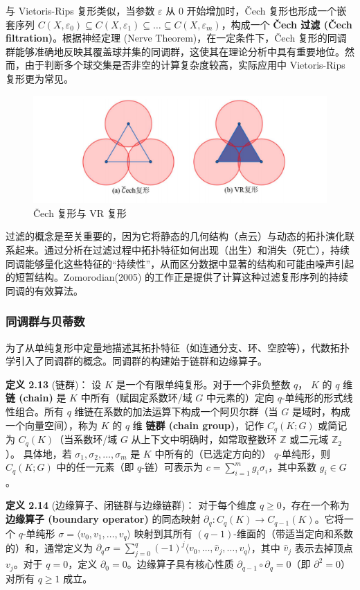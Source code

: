 与 Vietoris-Rips 复形类似，当参数 $\varepsilon$ 从 $0$ 开始增加时，Čech 复形也形成一个嵌套序列 $C(X, \varepsilon_0) \subseteq C(X, \varepsilon_1) \subseteq \dots \subseteq C(X, \varepsilon_m)$，构成一个 \textbf{Čech 过滤 (Čech filtration)}。根据神经定理 (Nerve Theorem)，在一定条件下，Čech 复形的同调群能够准确地反映其覆盖球并集的同调群，这使其在理论分析中具有重要地位。然而，由于判断多个球交集是否非空的计算复杂度较高，实际应用中 Vietoris-Rips 复形更为常见。
\begin{figure}[thbp!]
    \centering
    \includegraphics[width=.9\textwidth]{figure/VR复形.png}
    \caption{Čech 复形与 VR 复形}
\end{figure}
过滤的概念是至关重要的，因为它将静态的几何结构（点云）与动态的拓扑演化联系起来。通过分析在过滤过程中拓扑特征如何出现（出生）和消失（死亡），持续同调能够量化这些特征的“持续性”，从而区分数据中显著的结构和可能由噪声引起的短暂结构。Zomorodian(2005)\cite{zomorodian2004computing} 的工作正是提供了计算这种过滤复形序列的持续同调的有效算法。
\subsubsection{同调群与贝蒂数}
为了从单纯复形中定量地描述其拓扑特征（如连通分支、环、空腔等），代数拓扑学引入了同调群的概念。同调群的构建始于链群和边缘算子。

\textbf{定义 2.13} (链群)\cite{armstrong2013basic}：
设 $K$ 是一个有限单纯复形。对于一个非负整数 $q$， $K$ 的 $q$ 维 \textbf{链 (chain)} 是 $K$ 中所有（赋固定系数环/域 $G$ 中元素的）定向 $q$-单纯形的形式线性组合。所有 $q$ 维链在系数的加法运算下构成一个阿贝尔群（当 $G$ 是域时，构成一个向量空间），称为 $K$ 的 $q$ 维 \textbf{链群 (chain group)}，记作 $C_q(K; G)$ 或简记为 $C_q(K)$（当系数环/域 $G$ 从上下文中明确时，如常取整数环 $\mathbb{Z}$ 或二元域 $\mathbb{Z}_2$）。
具体地，若 $\sigma_1, \sigma_2, \ldots, \sigma_m$ 是 $K$ 中所有的（已选定方向的） $q$-单纯形，则 $C_q(K; G)$ 中的任一元素（即 $q$-链）可表示为 $c = \sum_{i=1}^m g_i \sigma_i$，其中系数 $g_i \in G$。

\textbf{定义 2.14} (边缘算子、闭链群与边缘链群)\cite{armstrong2013basic}：
对于每个维度 $q \ge 0$，存在一个称为 \textbf{边缘算子 (boundary operator)} 的同态映射 $\partial_q: C_q(K) \to C_{q-1}(K)$。它将一个 $q$-单纯形 $\sigma = \langle v_0, v_1, \ldots, v_q \rangle$ 映射到其所有 $(q-1)$-维面的（带适当定向和系数的）和，通常定义为 $\partial_q \sigma = \sum_{j=0}^q (-1)^j \langle v_0, \ldots, \hat{v}_j, \ldots, v_q \rangle$，其中 $\hat{v}_j$ 表示去掉顶点 $v_j$。对于 $q=0$，定义 $\partial_0 = 0$。边缘算子具有核心性质 $\partial_{q-1} \circ \partial_q = 0$（即 $\partial^2 = 0$）对所有 $q \ge 1$ 成立。

